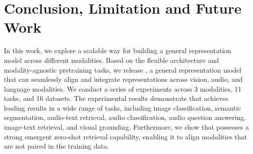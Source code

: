 \section{Conclusion, Limitation and Future Work}
In this work, we explore a scalable way for building a general representation model across different modalities.
Based on the flexible architecture and modality-agnostic pretraining tasks, we release \onepeace, a general representation model that can seamlessly align and integrate representations across vision, audio, and language modalities.
We conduct a series of experiments across 3 modalities, 11 tasks, and 16 datasets.
The experimental results demonstrate that \onepeace achieves leading results in a wide range of tasks, including image classification, semantic segmentation, audio-text retrieval, audio classification, audio question answering, image-text retrieval, and visual grounding.
Furthermore, we show that \onepeace possesses a strong emergent zero-shot retrieval capability, enabling it to align modalities that are not paired in the training data.


